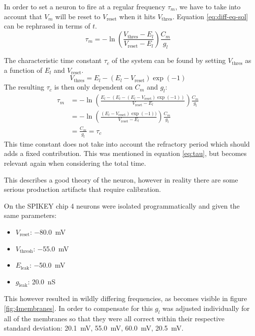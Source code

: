 \documentclass[a4paper,twocolumn]{article}
\begin{document}
In order to set a neuron to fire at a regular frequency $\tau_m$, we have to take
into account that $V_m$ will be reset to $V_\text{reset}$ when it hits
$V_\text{thres}$. Equation \eqref{eq:diff-eq-sol} can be rephrased in terms of
$t$.
\[
    \tau_m = -\ln(\frac{V_\text{thres} - E_l}{V_\text{reset} - E_l})
    \frac{C_m}{g_l}
\]

The characteristic time constant $\tau_c$ of the system can be found by setting
$V_\text{thres}$ as a function of $E_l$ and $V_\text{reset}$.
\[
    V_\text{thres} = E_l - (E_l - V_\text{reset})\exp(-1)
\]
The resulting $\tau_c$ is then only dependent on $C_m$ and $g_l$:
\begin{align*}
    \tau_m &= -\ln(\frac{E_l - (E_l - (E_l - V_\text{reset})\exp(-1))}{V_\text{reset} - E_l}) \frac{C_m}{g_l}\\
           &= -\ln(\frac{(E_l - V_\text{reset})\exp(-1))}{V_\text{reset} - E_l})\frac{C_m}{g_l} \\
           &= \frac{C_m}{g_l} = \tau_c
\end{align*}
This time constant does not take into account the refractory period which should
adds a fixed contribution. This was mentioned in equation \eqref{eq:tau}, but
becomes relevant again when considering the total time.

This describes a good theory of the neuron, however in reality there are some
serious production artifacts that require calibration.

On the SPIKEY chip 4 neurons were isolated programmatically and given the same
parameters:
\begin{itemize}
    \item $V_\text{reset}$: \SI{-80.0}{\milli\volt}
    \item $V_\text{thresh}$: \SI{-55.0}{\milli\volt}
    \item $E_\text{leak}$: \SI{-50.0}{\milli\volt}
    \item $g_\text{leak}$:  \SI{20.0}{\nano\siemens}
\end{itemize}

This however resulted in wildly differing frequencies, as becomes visible in
figure \ref{fig:4membranes}. In order to compensate for this $g_l$ was adjusted
individually for all of the membranes so that they were all correct within their
respective standard deviation: \SI{20.1}{\milli\volt}, \SI{55.0}{\milli\volt},
\SI{60.0}{\milli\volt}, \SI{20.5}{\milli\volt}.
\end{document}
